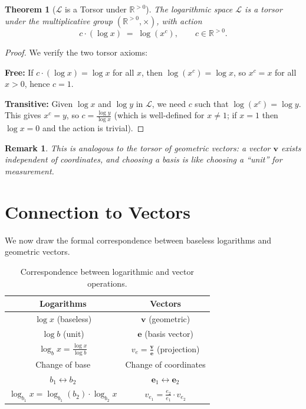 \documentclass[11pt]{article}
\newtheorem{theorem}[definition]{Theorem}
\newtheorem{remark}[definition]{Remark}
\begin{document}
\begin{theorem}[$\mathcal{L}$ is a Torsor under $\mathbb{R}^{>0}$]
\label{thm:torsor}
The logarithmic space $\mathcal{L}$ is a torsor under the multiplicative group $(\mathbb{R}^{>0}, \times)$, with action
\[
c \cdot (\log x) \;=\; \log(x^c), \qquad c \in \mathbb{R}^{>0}.
\]
\end{theorem}

\begin{proof}
We verify the two torsor axioms:

\textbf{Free:} If $c \cdot (\log x) = \log x$ for all $x$, then $\log(x^c) = \log x$, so $x^c = x$ for all $x > 0$, hence $c = 1$.

\textbf{Transitive:} Given $\log x$ and $\log y$ in $\mathcal{L}$, we need $c$ such that $\log(x^c) = \log y$. This gives $x^c = y$, so $c = \frac{\log y}{\log x}$ (which is well-defined for $x \neq 1$; if $x = 1$ then $\log x = 0$ and the action is trivial).
\end{proof}

\begin{remark}
This is analogous to the torsor of geometric vectors: a vector $\mathbf{v}$ exists independent of coordinates, and choosing a basis is like choosing a ``unit'' for measurement.
\end{remark}

\section{Connection to Vectors}
\label{sec:vectors}

We now draw the formal correspondence between baseless logarithms and geometric vectors.

\begin{table}[h]
\centering
\begin{tabular}{cc}
\hline
\textbf{Logarithms} & \textbf{Vectors} \\
\hline
$\log x$ (baseless) & $\mathbf{v}$ (geometric) \\
$\log b$ (unit) & $\mathbf{e}$ (basis vector) \\
$\log_b x = \frac{\log x}{\log b}$ & $v_e = \frac{\mathbf{v}}{\mathbf{e}}$ (projection) \\
Change of base & Change of coordinates \\
$b_1 \leftrightarrow b_2$ & $\mathbf{e}_1 \leftrightarrow \mathbf{e}_2$ \\
$\log_{b_1} x = \log_{b_1}(b_2) \cdot \log_{b_2} x$ & $v_{e_1} = \frac{e_2}{e_1} \cdot v_{e_2}$ \\
\hline
\end{tabular}
\caption{Correspondence between logarithmic and vector operations.}
\label{tab:correspondence}
\end{table}
\end{document}
